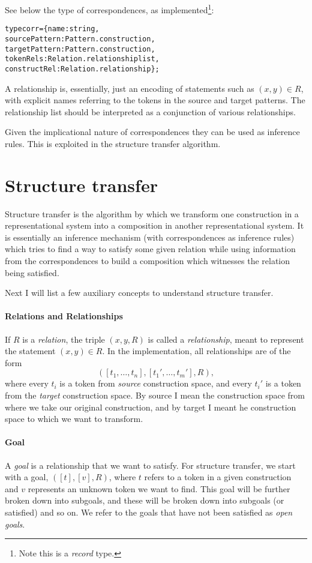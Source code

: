 \documentclass[a4paper]{article}
\theoremstyle{definition}
\begin{document}
	See below the type of correspondences, as implemented\footnote{Note this is a \textit{record} type.}:
	\begin{alltt}
type corr = \{name : string,
             sourcePattern : Pattern.construction,
             targetPattern : Pattern.construction,
             tokenRels : Relation.relationship list,
             constructRel : Relation.relationship\};
	\end{alltt}
	A relationship is, essentially, just an encoding of statements such as $(x,y)\in R$, with explicit names referring to the tokens in the source and target patterns. The relationship list should be interpreted as a conjunction of various relationships.
	
	Given the implicational nature of correspondences they can be used as inference rules. This is exploited in the structure transfer algorithm.
	
	\section{Structure transfer}
	Structure transfer is the algorithm by which we transform one construction in a representational system into a composition in another representational system. It is essentially an inference mechanism (with correspondences as inference rules) which tries to find a way to satisfy some given relation while using information from the correspondences to build a composition which witnesses the relation being satisfied.
	
	Next I will list a few auxiliary concepts to understand structure transfer.
	\paragraph{Relations and Relationships}
	If $R$ is a \textit{relation}, the triple $(x,y,R)$ is called a \textit{relationship}, meant to represent the statement $(x,y) \in R$. In the implementation, all relationships are of the form $$([t_1,\ldots,t_n],[t_1',\ldots,t_m'],R),$$ where every $t_i$ is a token from \textit{source} construction space, and every $t_i'$ is a token from the \textit{target} construction space. By source I mean the construction space from where we take our original construction, and by target I meant he construction space to which we want to transform.
	
	\paragraph{Goal} A \textit{goal} is a relationship that we want to satisfy. For structure transfer, we start with a goal, $([t],[v],R)$, where $t$ refers to a token in a given construction and $v$ represents an unknown token we want to find. This goal will be further broken down into subgoals, and these will be broken down into subgoals (or satisfied) and so on. We refer to the goals that have not been satisfied as \textit{open goals}.
	
\end{document}
